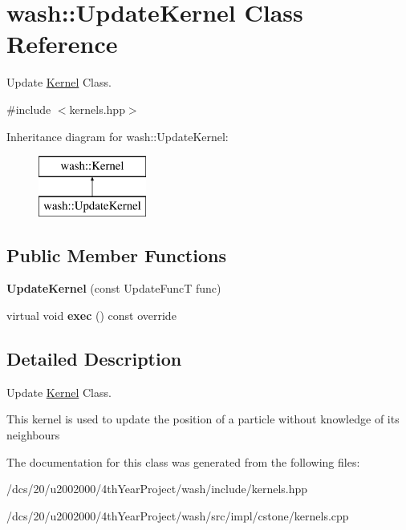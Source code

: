 \hypertarget{classwash_1_1UpdateKernel}{}\section{wash\+:\+:Update\+Kernel Class Reference}
\label{classwash_1_1UpdateKernel}


Update \mbox{\hyperlink{classwash_1_1Kernel}{Kernel}} Class.  




{\ttfamily \#include $<$kernels.\+hpp$>$}

Inheritance diagram for wash\+:\+:Update\+Kernel\+:\begin{figure}[H]
\begin{center}
\leavevmode
\includegraphics[height=2.000000cm]{classwash_1_1UpdateKernel}
\end{center}
\end{figure}
\subsection*{Public Member Functions}
\begin{DoxyCompactItemize}
\item 
\mbox{\label{classwash_1_1UpdateKernel_a2cd95c4f9bcbceff9df7d094f7d7011f}} 
{\bfseries Update\+Kernel} (const Update\+FuncT func)
\item 
\mbox{\label{classwash_1_1UpdateKernel_a72ec6b0ea453d97708f3fcfd98970366}} 
virtual void {\bfseries exec} () const override
\end{DoxyCompactItemize}


\subsection{Detailed Description}
Update \mbox{\hyperlink{classwash_1_1Kernel}{Kernel}} Class. 

This kernel is used to update the position of a particle without knowledge of its neighbours 

The documentation for this class was generated from the following files\+:\begin{DoxyCompactItemize}
\item 
/dcs/20/u2002000/4th\+Year\+Project/wash/include/kernels.\+hpp\item 
/dcs/20/u2002000/4th\+Year\+Project/wash/src/impl/cstone/kernels.\+cpp\end{DoxyCompactItemize}
